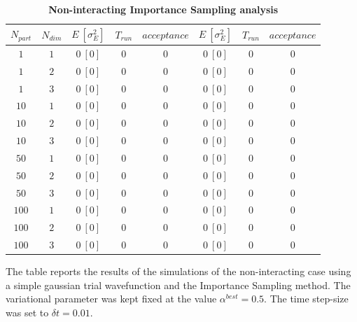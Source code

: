 \begin{table}[hbtp]
\begin{tabular}{cc|ccc|ccc}
        \hline
         $N_{part}$ & $N_{dim}$ & $E \ [\sigma^2_E]$ & $T_{run}$ & $acceptance$ & $E \ [\sigma^2_E]$ & $T_{run}$ & $acceptance$ \\
         \hline
         $1$ & $1$ & $0 \ [0]$ & $0$ & $0$  & $0 \ [0]$ & $0$ & $0$ \\
         $1$ & $2$ & $0 \ [0]$ & $0$ & $0$  & $0 \ [0]$ & $0$ & $0$ \\
         $1$ & $3$ & $0 \ [0]$ & $0$ & $0$  & $0 \ [0]$ & $0$ & $0$ \\
         \hline
         $10$ & $1$ & $0 \ [0]$ & $0$ & $0$  & $0 \ [0]$ & $0$ & $0$ \\
         $10$ & $2$ & $0 \ [0]$ & $0$ & $0$  & $0 \ [0]$ & $0$ & $0$ \\
         $10$ & $3$ & $0 \ [0]$ & $0$ & $0$  & $0 \ [0]$ & $0$ & $0$ \\
         \hline
         $50$ & $1$ & $0 \ [0]$ & $0$ & $0$  & $0 \ [0]$ & $0$ & $0$ \\
         $50$ & $2$ & $0 \ [0]$ & $0$ & $0$  & $0 \ [0]$ & $0$ & $0$ \\
         $50$ & $3$ & $0 \ [0]$ & $0$ & $0$  & $0 \ [0]$ & $0$ & $0$ \\
         \hline
         $100$ & $1$ & $0 \ [0]$ & $0$ & $0$  & $0 \ [0]$ & $0$ & $0$ \\
         $100$ & $2$ & $0 \ [0]$ & $0$ & $0$  & $0 \ [0]$ & $0$ & $0$ \\
         $100$ & $3$ & $0 \ [0]$ & $0$ & $0$  & $0 \ [0]$ & $0$ & $0$ \\
         \hline
    \end{tabular}
    \caption{\bfseries Non-interacting Importance Sampling analysis}{The table reports the results of the simulations of the non-interacting case using a simple gaussian trial wavefunction and the Importance Sampling method. The variational parameter was kept fixed at the value $\alpha^{best}=0.5$. The time step-size was set to $\delta t = 0.01$.}
    \label{tab:tab_x_importance}
    

\end{table}
